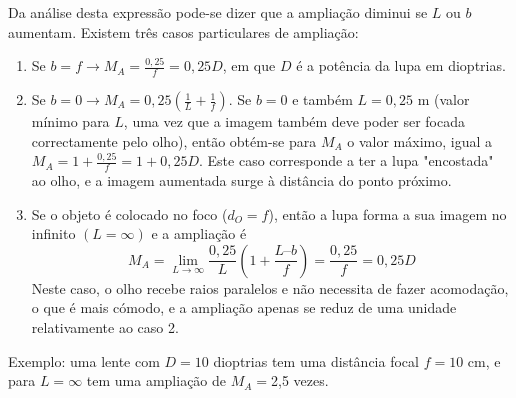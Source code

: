 \documentclass[12pt,a4paper,oneside]{paper}
\begin{document}
Da análise desta expressão pode-se dizer que a ampliação diminui se $L$ ou $b$ aumentam. Existem três casos particulares de ampliação:

\begin{enumerate}

\item  Se $b=f \to M_A = \frac{0,25}{f}=0,25D$, em que $D$ é a potência da lupa em dioptrias.

\item  Se $b=0\to M_A = 0,25\left(\frac{1}{L}+\frac{1}{f}\right)$.
Se $b= 0$ e também $L = 0,25 $ m (valor mínimo para $L$, uma vez que a imagem também deve poder ser focada correctamente pelo olho),
então obtém-se para $M_A$ o valor máximo, igual a $M_A = 1+\frac{0,25}{f}= 1+0,25D$. Este caso corresponde a ter a lupa "encostada"
ao olho, e a imagem aumentada surge à distância do ponto próximo.

\item  Se o objeto é colocado no foco ($d_O=f$), então a lupa forma a sua imagem no infinito $(L = \infty)$ e a ampliação é 
\begin{equation*}
M_A = \lim_{L\to\infty}\frac{0,25}{L}\left(1+\frac{L–b}{f}\right)= \frac{0,25}{f}=0,25D
\end{equation*}
Neste caso, o olho recebe raios paralelos e não necessita de fazer acomodação, o que é mais cómodo, e a ampliação apenas
se reduz de uma unidade relativamente ao caso 2.
\end{enumerate}

Exemplo: uma lente com $D=10$ dioptrias tem uma distância focal $f=10$ cm, e para $L=\infty$ tem uma ampliação de $M_A=$2,5 vezes.




\end{document}
